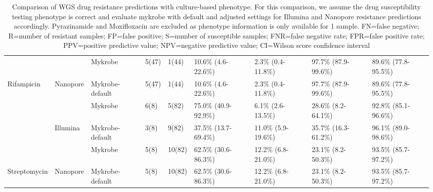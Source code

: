 \begin{table}[]
{\begin{tabular}{|l|l|l|l|l|l|l|l|l|}
 &
   &
  Mykrobe &
  5(47) &
  1(44) &
  10.6\% (4.6-22.6\%) &
  2.3\% (0.4-11.8\%) &
  97.7\% (87.9-99.6\%) &
  89.6\% (77.8-95.5\%) \\ \cline{3-9} 
\multirow{-4}{*}{Rifampicin} &
  \multirow{-2}{*}{Nanopore} &
  \cellcolor[HTML]{EFEFEF}Mykrobe-default &
  \cellcolor[HTML]{EFEFEF}5(47) &
  \cellcolor[HTML]{EFEFEF}1(44) &
  \cellcolor[HTML]{EFEFEF}10.6\% (4.6-22.6\%) &
  \cellcolor[HTML]{EFEFEF}2.3\% (0.4-11.8\%) &
  \cellcolor[HTML]{EFEFEF}97.7\% (87.9-99.6\%) &
  \cellcolor[HTML]{EFEFEF}89.6\% (77.8-95.5\%) \\ \hline
 &
   &
  Mykrobe &
  6(8) &
  5(82) &
  75.0\% (40.9-92.9\%) &
  6.1\% (2.6-13.5\%) &
  28.6\% (8.2-64.1\%) &
  92.8\% (85.1-96.6\%) \\ \cline{3-9} 
 &
  \multirow{-2}{*}{Illumina} &
  \cellcolor[HTML]{EFEFEF}Mykrobe-default &
  \cellcolor[HTML]{EFEFEF}3(8) &
  \cellcolor[HTML]{EFEFEF}9(82) &
  \cellcolor[HTML]{EFEFEF}37.5\% (13.7-69.4\%) &
  \cellcolor[HTML]{EFEFEF}11.0\% (5.9-19.6\%) &
  \cellcolor[HTML]{EFEFEF}35.7\% (16.3-61.2\%) &
  \cellcolor[HTML]{EFEFEF}96.1\% (89.0-98.6\%) \\ \cline{2-9} 
 &
   &
  Mykrobe &
  5(8) &
  10(82) &
  62.5\% (30.6-86.3\%) &
  12.2\% (6.8-21.0\%) &
  23.1\% (8.2-50.3\%) &
  93.5\% (85.7-97.2\%) \\ \cline{3-9} 
\multirow{-4}{*}{Streptomycin} &
  \multirow{-2}{*}{Nanopore} &
  \cellcolor[HTML]{EFEFEF}Mykrobe-default &
  \cellcolor[HTML]{EFEFEF}5(8) &
  \cellcolor[HTML]{EFEFEF}10(82) &
  \cellcolor[HTML]{EFEFEF}62.5\% (30.6-86.3\%) &
  \cellcolor[HTML]{EFEFEF}12.2\% (6.8-21.0\%) &
  \cellcolor[HTML]{EFEFEF}23.1\% (8.2-50.3\%) &
  \cellcolor[HTML]{EFEFEF}93.5\% (85.7-97.2\%) \\ \hline
\end{tabular}%
}
\caption{Comparison of WGS drug resistance predictions with culture-based phenotype. For this comparison, we assume the drug susceptibility testing phenotype is correct and evaluate mykrobe with default and adjusted settings for Illumina and Nanopore resistance predictions accordingly. Pyrazinamide and Moxifloxacin are excluded as phenotype information is only available for 1 sample. FN=false negative; R=number of resistant samples; FP=false positive; S=number of susceptible samples; FNR=false negative rate; FPR=false positive rate; PPV=positive predictive value; NPV=negative predictive value; CI=Wilson score confidence interval}
\label{tab:mykrobe-settings-pheno}
\end{table}

